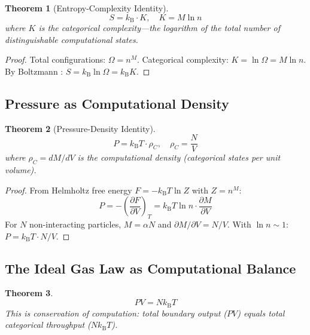 \documentclass[11pt,twocolumn,a4paper]{article}
\newtheorem{theorem}{Theorem}[section]
\theoremstyle{definition}
\theoremstyle{remark}
\newcommand{\kB}{k_{\mathrm{B}}}
\begin{document}
\begin{theorem}[Entropy-Complexity Identity]
\label{thm:entropy_complexity}
\begin{equation}
S = \kB \cdot K, \quad K = M \ln n
\label{eq:entropy_complexity}
\end{equation}
where $K$ is the \emph{categorical complexity}---the logarithm of the total number of distinguishable computational states.
\end{theorem}

\begin{proof}
Total configurations: $\Omega = n^M$. Categorical complexity: $K = \ln \Omega = M \ln n$. By Boltzmann \citep{boltzmann1877}: $S = \kB \ln \Omega = \kB K$.
\end{proof}

\subsection{Pressure as Computational Density}

\begin{theorem}[Pressure-Density Identity]
\label{thm:pressure}
\begin{equation}
P = \kB T \cdot \rho_C, \quad \rho_C = \frac{N}{V}
\label{eq:pressure_density}
\end{equation}
where $\rho_C = dM/dV$ is the computational density (categorical states per unit volume).
\end{theorem}

\begin{proof}
From Helmholtz free energy $F = -\kB T \ln Z$ with $Z = n^M$:
\begin{equation}
P = -\left(\frac{\partial F}{\partial V}\right)_T = \kB T \ln n \cdot \frac{\partial M}{\partial V}
\end{equation}
For $N$ non-interacting particles, $M = \alpha N$ and $\partial M / \partial V = N/V$. With $\ln n \sim 1$: $P = \kB T \cdot N/V$.
\end{proof}

\subsection{The Ideal Gas Law as Computational Balance}

\begin{theorem}
\label{thm:ideal_gas}
\begin{equation}
PV = N\kB T
\end{equation}
This is conservation of computation: total boundary output ($PV$) equals total categorical throughput ($N\kB T$).
\end{theorem}
\end{document}
